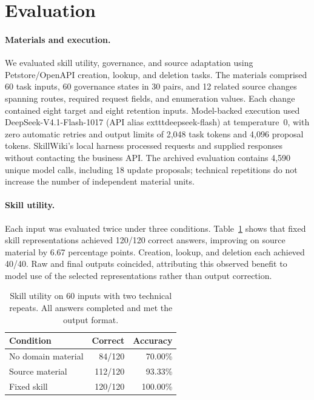 \section{Evaluation}
\label{sw-eval-section}

\paragraph{Materials and execution.}
We evaluated skill utility, governance, and source adaptation using Petstore/OpenAPI
creation, lookup, and deletion tasks. The materials comprised 60 task inputs,
60 governance states in 30 pairs, and 12 related source changes spanning routes,
required request fields, and enumeration values. Each change contained eight target
and eight retention inputs. Model-backed execution used DeepSeek-V4.1-Flash-1017
(API alias 	exttt{deepseek-flash}) at
temperature~0, with zero automatic retries and output limits of 2,048 task tokens
and 4,096 proposal tokens. SkillWiki's local harness processed requests and supplied
responses without contacting the business API. The archived evaluation contains
4,590 unique model calls, including 18 update proposals; technical repetitions do
not increase the number of independent material units.

\paragraph{Skill utility.}
Each input was evaluated twice under three conditions. Table~\ref{sw-eval-utility}
shows that fixed skill representations achieved 120/120 correct answers, improving
on source material by 6.67 percentage points. Creation, lookup, and deletion each
achieved 40/40. Raw and final outputs coincided, attributing this observed benefit
to model use of the selected representations rather than output correction.

\begin{table}[t]
\centering
\caption{Skill utility on 60 inputs with two technical repeats. All answers completed and met the output format.}
\label{sw-eval-utility}
\begin{tabular}{lrr}
\hline
Condition & Correct & Accuracy \\
\hline
No domain material & 84/120 & 70.00\% \\
Source material & 112/120 & 93.33\% \\
Fixed skill & 120/120 & 100.00\% \\
\hline
\end{tabular}
\end{table}

